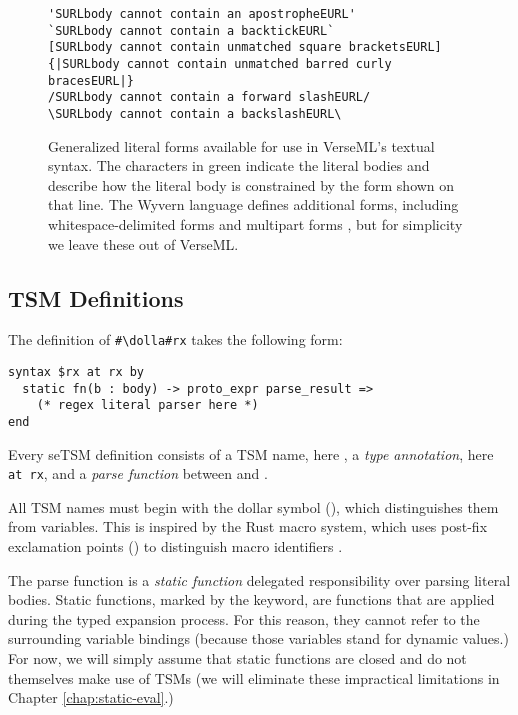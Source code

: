 

\begin{figure}
\begin{lstlisting}
'SURLbody cannot contain an apostropheEURL'
`SURLbody cannot contain a backtickEURL`
[SURLbody cannot contain unmatched square bracketsEURL]
{|SURLbody cannot contain unmatched barred curly bracesEURL|}
/SURLbody cannot contain a forward slashEURL/
\SURLbody cannot contain a backslashEURL\
\end{lstlisting}
\caption[Available Generalized Literal Forms]{Generalized literal forms available for use in VerseML's textual syntax. The characters in green indicate the literal bodies and describe how the literal body is constrained by the form shown on that line. The Wyvern language defines additional forms, including whitespace-delimited forms \cite{TSLs} and multipart forms \cite{sac15}, but for simplicity we leave these out of VerseML.}
\label{fig:literal-forms}
\end{figure}
\subsection{TSM Definitions}\label{sec:uetsms-definition}
The definition of \lstinline{#\dolla#rx} takes the following form:
\begin{lstlisting}[numbers=none,mathescape=|]
syntax $rx at rx by 
  static fn(b : body) -> proto_expr parse_result => 
    (* regex literal parser here *)
end
\end{lstlisting}
Every seTSM definition consists of a TSM name, here , a \emph{type annotation}, here \lstinline{at rx}, and a \emph{parse function} between  and .

All TSM names must begin with the dollar symbol (\li{#\dolla#}), which distinguishes them from variables. This is inspired by the Rust macro system, which uses post-fix exclamation points (\li{!}) to distinguish macro identifiers \cite{Rust/Macros}.

The {parse function} is a \emph{static function} delegated responsibility over parsing literal bodies. Static functions, marked by the  keyword, are functions that are applied during the typed expansion process. For this reason, they cannot refer to the surrounding variable bindings (because those variables stand for dynamic values.) For now, we will simply assume that static functions are closed and do not themselves make use of TSMs (we will eliminate these impractical limitations in Chapter \ref{chap:static-eval}.)

